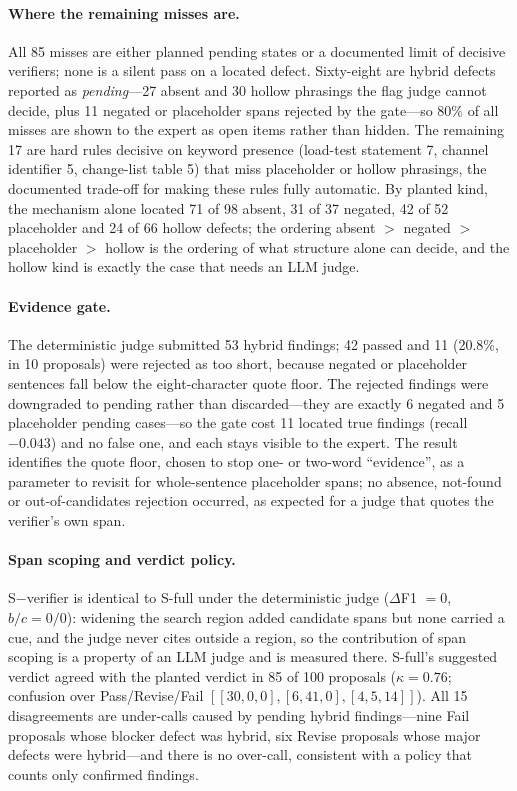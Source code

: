 \documentclass{IOS-Book-Article}
\begin{document}
\paragraph{Where the remaining misses are.}
All 85 misses are either planned pending states or a documented limit of decisive verifiers; none is a silent pass on a located defect. Sixty-eight are hybrid defects reported as \emph{pending}---27 absent and 30 hollow phrasings the flag judge cannot decide, plus 11 negated or placeholder spans rejected by the gate---so 80\% of all misses are shown to the expert as open items rather than hidden. The remaining 17 are hard rules decisive on keyword presence (load-test statement 7, channel identifier 5, change-list table 5) that miss placeholder or hollow phrasings, the documented trade-off for making these rules fully automatic. By planted kind, the mechanism alone located 71 of 98 absent, 31 of 37 negated, 42 of 52 placeholder and 24 of 66 hollow defects; the ordering absent $>$ negated $>$ placeholder $>$ hollow is the ordering of what structure alone can decide, and the hollow kind is exactly the case that needs an LLM judge.

\paragraph{Evidence gate.}
The deterministic judge submitted 53 hybrid findings; 42 passed and 11 (20.8\%, in 10 proposals) were rejected as too short, because negated or placeholder sentences fall below the eight-character quote floor. The rejected findings were downgraded to pending rather than discarded---they are exactly 6 negated and 5 placeholder pending cases---so the gate cost 11 located true findings (recall $-0.043$) and no false one, and each stays visible to the expert. The result identifies the quote floor, chosen to stop one- or two-word ``evidence'', as a parameter to revisit for whole-sentence placeholder spans; no absence, not-found or out-of-candidates rejection occurred, as expected for a judge that quotes the verifier's own span.

\paragraph{Span scoping and verdict policy.}
S$-$verifier is identical to S-full under the deterministic judge ($\Delta$F1 $=0$, $b/c=0/0$): widening the search region added candidate spans but none carried a cue, and the judge never cites outside a region, so the contribution of span scoping is a property of an LLM judge and is measured there. S-full's suggested verdict agreed with the planted verdict in 85 of 100 proposals ($\kappa=0.76$; confusion over Pass/Revise/Fail $[[30,0,0],[6,41,0],[4,5,14]]$). All 15 disagreements are under-calls caused by pending hybrid findings---nine Fail proposals whose blocker defect was hybrid, six Revise proposals whose major defects were hybrid---and there is no over-call, consistent with a policy that counts only confirmed findings.
\end{document}
